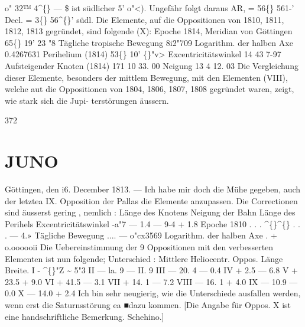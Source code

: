 \documentclass[12pt,a4paper]{article}
\newcommand{\degree}{\textdegree}
\begin{document}
o"  32™  4\textasciicircum\{\}      ---         \$  ist  südlicher     5'  o"<). 
Ungefähr  folgt  daraus 
AR,  =  56\degree\{\}  561-'     Decl.  =  3\degree\{\}  56\textasciicircum\{\}'  südl. 
Die  Elemente,  auf  die  Oppositionen  von  1810,  1811,  1812,  1813  gegründet,  sind  folgende  (X): 
Epoche  1814,  Meridian  von  Göttingen    65\degree\{\}  19'  23 "8 
Tägliche  tropische  Bewegung    8i2"709 
Logarithm.  der  halben  Axe    0.4267631 
Perihelium  (1814)    53\degree\{\}   10'  \degree\{\}"v> 
Excentricitätswinkel    14     43  7-97 
Aufsteigender  Knoten  (1814)    171     10  33. 00 
Neigung    13      4  12. 03 
Die  Vergleichung  dieser  Elemente,  besonders  der  mittlem  Bewegung,  mit  den  Elementen  (VIII), 
welche  aut  die  Oppositionen  von  1804,  1806,  1807,  1808  gegründet  waren,  zeigt,  wie  stark  sich  die  Jupi- 
terstörungen äussern. 


\newpage
372 

\section*{JUNO}
Göttingen,  den  i6.  December  1813. 
---   Ich  habe  mir  doch  die  Mühe  gegeben,   auch   der  letztea  IX.  Opposition  der  Pallas  die 
Elemente  anzupassen.     Die  Correctionen  sind  äusserst  gering ,  nemlich : 
Länge  des  Knotens 
Neigung  der  Bahn 
Länge  des  Perihels 
Excentricitätswinkel 
-a"7 
---  1.4 
---  9-4 
+  1.8 
Epoche  1810     .    .    .  \textasciicircum\{\}\textasciicircum\{\}    .    .    .    --- 4.» 
Tägliche  Bewegung      ....     --- o"cx3569 
Logarithm.  der  halben  Axe       .     +  o.oooooii 
Die  Uebereinstimmung  der  9  Oppositionen  mit  den  verbesserten  Elementen  ist  nun  folgende; 
Unterschied : 
Mittlere 
Heliocentr. 
Oppos. 
Länge 
Breite. 
I 
-   \textasciicircum\{\}"Z 
\textasciitilde{}   5"3 
II 
--- la.  9 
---  II.  9 
III 
--- 20.  4 
---   0.4 
IV 
+  2.5 
---    6.8 
V 
+  23.5 
+    9.0 
VI 
+  41.5 
---    3.1 
VII 
+  14. 1 
---     7.2 
VIII 
---  16. 1 
+    4.0 
IX 
---  10.9 
---   0.0 
X 
---  14.0 
+    2.4 
Ich  bin  sehr  neugierig,  wie   die  Unterschiede  ausfallen   werden,  wenn  erst  die  Saturnsstörung ea 
■dazu  kommen.     [Die  Angabe  für  Oppos.  X  ist  eine  handschriftliche  Bemerkung.     Schehino.] 
\end{document}
